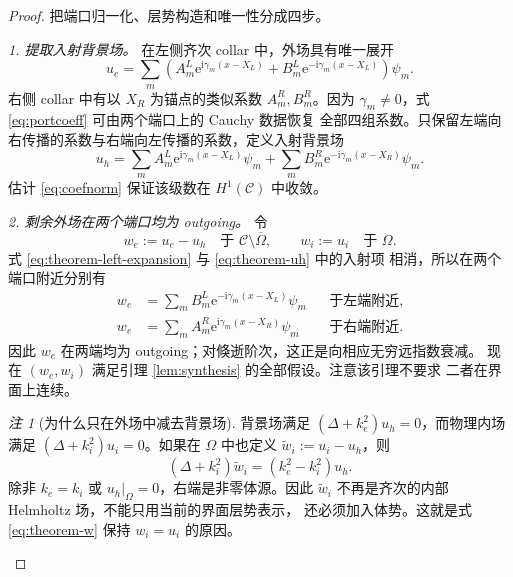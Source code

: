 \documentclass[UTF8,11pt,fontset=fandol]{ctexart}
\newcommand{\C}{\mathcal C}
\newcommand{\Om}{\Omega}
\newcommand{\ii}{\mathrm i}
\newcommand{\ee}{\mathrm e}
\theoremstyle{plain}
\theoremstyle{definition}
\theoremstyle{remark}
\newtheorem{remark}[theorem]{注}
\begin{document}
\begin{proof}
把端口归一化、层势构造和唯一性分成四步。

\emph{1. 提取入射背景场。}
在左侧齐次 collar 中，外场具有唯一展开
\begin{equation}
u_e=\sum_m\left(
A_m^L\ee^{\ii\gamma_m(x-X_L)}
+B_m^L\ee^{-\ii\gamma_m(x-X_L)}
\right)\psi_m.
\label{eq:theorem-left-expansion}
\end{equation}
右侧 collar 中有以 \(X_R\) 为锚点的类似系数 \(A_m^R,B_m^R\)。因为
\(\gamma_m\ne0\)，式 \eqref{eq:portcoeff} 可由两个端口上的 Cauchy 数据恢复
全部四组系数。只保留左端向右传播的系数与右端向左传播的系数，定义入射背景场
\begin{equation}
u_h=\sum_m A_m^L\ee^{\ii\gamma_m(x-X_L)}\psi_m
+\sum_m B_m^R\ee^{-\ii\gamma_m(x-X_R)}\psi_m.
\label{eq:theorem-uh}
\end{equation}
估计 \eqref{eq:coefnorm} 保证该级数在 \(H^1(\C)\) 中收敛。

\emph{2. 剩余外场在两个端口均为 outgoing。}
令
\begin{equation}
w_e:=u_e-u_h\quad\text{于 }\C\setminus\overline\Om,
\qquad
w_i:=u_i\quad\text{于 }\Om.
\label{eq:theorem-w}
\end{equation}
式 \eqref{eq:theorem-left-expansion} 与 \eqref{eq:theorem-uh} 中的入射项
相消，所以在两个端口附近分别有
\begin{align}
w_e&=\sum_m B_m^L\ee^{-\ii\gamma_m(x-X_L)}\psi_m
&&\text{于左端附近},\label{eq:w-left-out}\\
w_e&=\sum_m A_m^R\ee^{\ii\gamma_m(x-X_R)}\psi_m
&&\text{于右端附近}.\label{eq:w-right-out}
\end{align}
因此 \(w_e\) 在两端均为 outgoing；对倏逝阶次，这正是向相应无穷远指数衰减。
现在 \((w_e,w_i)\) 满足引理 \ref{lem:synthesis} 的全部假设。注意该引理不要求
二者在界面上连续。

\begin{remark}[为什么只在外场中减去背景场]
背景场满足 \((\Delta+k_e^2)u_h=0\)，而物理内场满足
\((\Delta+k_i^2)u_i=0\)。如果在 \(\Om\) 中也定义
\(\widetilde w_i:=u_i-u_h\)，则
\begin{equation}
  (\Delta+k_i^2)\widetilde w_i
  =(k_e^2-k_i^2)u_h.
  \label{eq:interior-background-subtraction}
\end{equation}
除非 $k_e=k_i$ 或 $u_h|_\Om=0$，右端是非零体源。因此
\(\widetilde w_i\) 不再是齐次的内部 Helmholtz 场，不能只用当前的界面层势表示，
还必须加入体势。这就是式 \eqref{eq:theorem-w} 保持 $w_i=u_i$ 的原因。
\end{remark}


\end{proof}
\end{document}
